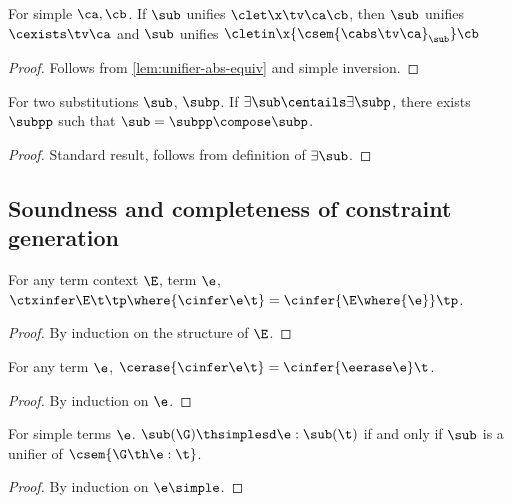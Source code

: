 \documentclass[acmsmall,screen,nonacm%
\Anonymous{,anonymous}{}%
\Final{}{,review}%
]{acmart}
\begin{document}
\begin{lemma}
  For simple $\ca, \cb$.
  If $\sub$ unifies $\clet \x \tv \ca \cb$, then
  $\sub$ unifies $\cexists \tv \ca$ and
  $\sub$ unifies $\cletin \x {\csem {\cabs \tv \ca}_\sub} \cb$
  \begin{proof}
    Follows from \cref{lem:unifier-abs-equiv} and simple inversion.
  \end{proof}
\end{lemma}

\begin{lemma}
  \label{lem:mgus}
  For two substitutions $\sub$, $\subp$. If $\exists \sub \centails \exists \subp$, there exists
  $\subpp$ such that $\sub = \subpp \compose \subp$.
  \begin{proof}
    Standard result, follows from definition of $\exists \sub$.
  \end{proof}
\end{lemma}

\subsection{Soundness and completeness of constraint generation}

\begin{lemma}
  \label{lem:ctxt-gen-correctness}
  For any term context $\E$, term $\e$, $\ctxinfer \E \t \tp \where{\cinfer \e \t} = \cinfer {\E\where{\e}} \tp$.
  \begin{proof}
    By induction on the structure of $\E$.
  \end{proof}
\end{lemma}

\begin{lemma}
  \label{lem:erasure-constraint-gen}
  For any term $\e$, $\cerase {\cinfer \e \t} = \cinfer {\eerase \e} \t$.
  \begin{proof}
    By induction on $\e$.
  \end{proof}
\end{lemma}

\begin{lemma}
  \label{lem:simple-soundness-completeness}
  For simple terms $\e$.
  $\sub(\G) \thsimplesd \e : \sub(\t)$ if and only if $\sub$ is a unifier of $\csem {\G \th \e : \t}$.
  \begin{proof}
    By induction on $\e \simple$.
  \end{proof}
\end{lemma}
\end{document}
